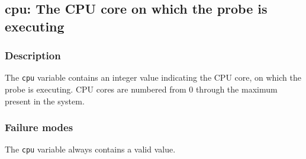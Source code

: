\clearpage
{}
{}
\label{vars:cpu}
\subsection*{cpu: The CPU core on which the probe is executing}

\subsubsection*{Description}

The \verb|cpu| variable contains an integer value indicating the CPU
core, on which the probe is executing.  CPU cores are numbered from 0
through the maximum present in the system.

\subsubsection*{Failure modes}

The \verb|cpu| variable always contains a valid value.
